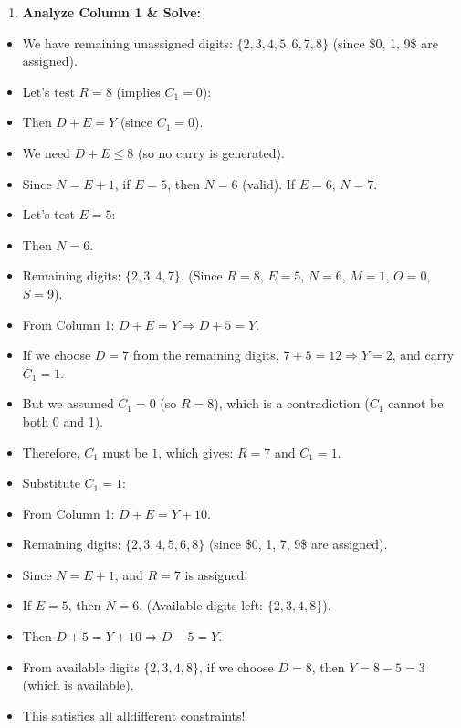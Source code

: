\begin{enumerate}
  \item \textbf{Analyze Column 1 \& Solve:}
\end{enumerate}
\begin{itemize}
  \item   We have remaining unassigned digits: $\{2, 3, 4, 5, 6, 7, 8\}$ (since \$0, 1, 9\$ are assigned).
  \item   Let's test $R = 8$ (implies $C_1 = 0$):
  \item   Then $D + E = Y$ (since $C_1 = 0$).
  \item   We need $D + E \le 8$ (so no carry is generated).
  \item   Since $N = E + 1$, if $E = 5$, then $N = 6$ (valid). If $E = 6$, $N = 7$.
  \item   Let's test $E = 5$:
  \item   Then $N = 6$.
  \item   Remaining digits: $\{2, 3, 4, 7\}$. (Since $R = 8$, $E = 5$, $N = 6$, $M = 1$, $O = 0$, $S = 9$).
  \item   From Column 1: $D + E = Y \Rightarrow D + 5 = Y$.
  \item   If we choose $D = 7$ from the remaining digits, $7 + 5 = 12 \Rightarrow Y = 2$, and carry $C_1 = 1$.
  \item   But we assumed $C_1 = 0$ (so $R = 8$), which is a contradiction ($C_1$ cannot be both 0 and 1).
  \item   Therefore, $C_1$ must be $1$, which gives: \textbf{$R = 7$} and \textbf{$C_1 = 1$}.
  \item   Substitute $C_1 = 1$:
  \item   From Column 1: $D + E = Y + 10$.
  \item   Remaining digits: $\{2, 3, 4, 5, 6, 8\}$ (since \$0, 1, 7, 9\$ are assigned).
  \item   Since $N = E + 1$, and $R=7$ is assigned:
  \item   If $E = 5$, then $N = 6$. (Available digits left: $\{2, 3, 4, 8\}$).
  \item   Then $D + 5 = Y + 10 \Rightarrow D - 5 = Y$.
  \item   From available digits $\{2, 3, 4, 8\}$, if we choose $D = 8$, then $Y = 8 - 5 = 3$ (which is available).
  \item   This satisfies all alldifferent constraints!
\end{itemize}

